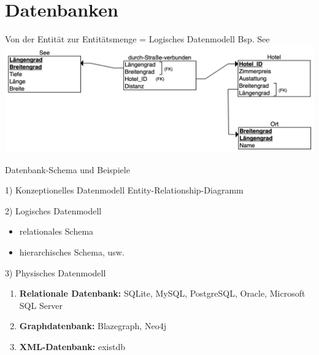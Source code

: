 \section{Datenbanken}


\begin{frame}{Von der Entität zur Entitätsmenge = Logisches Datenmodell Bsp. See}
  \includegraphics[width=\textwidth]{img/logisches-datenmodell-see.png} 
\end{frame}

\begin{frame}{Datenbank-Schema und Beispiele}
\begin{alertblock}{1) Konzeptionelles Datenmodell}
Entity-Relationship-Diagramm
\end{alertblock}

\begin{alertblock}{2) Logisches Datenmodell }
\begin{itemize}
    \item relationales Schema
    \item hierarchisches Schema, usw.
\end{itemize}
\end{alertblock}

\begin{alertblock}{3) Physisches Datenmodell}
\begin{enumerate}
    \item \textbf{Relationale Datenbank:} SQLite, MySQL, PostgreSQL, Oracle, Microsoft SQL Server
    \item \textbf{Graphdatenbank:} Blazegraph, Neo4j
    \item \textbf{XML-Datenbank:} existdb
\end{enumerate}
\end{alertblock} 
\end{frame}

